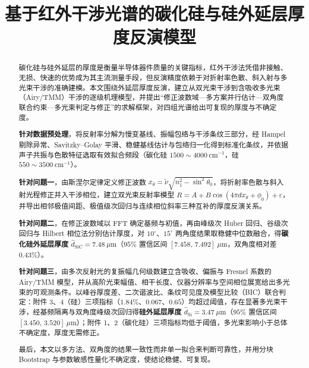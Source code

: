 \documentclass[withoutpreface,bwprint]{cumcmthesis}
\title{基于红外干涉光谱的碳化硅与硅外延层厚度反演模型}
\begin{document}
\maketitle

\begin{abstract}
碳化硅与硅外延层的厚度是衡量半导体器件质量的关键指标，红外干涉法凭借非接触、无损、快速的优势成为其主流测量手段，但反演精度依赖于对折射率色散、斜入射与多光束干涉的准确建模。本文围绕外延层厚度反演，建立从双光束干涉到含吸收多光束（Airy/TMM）干涉的逐级机理模型，并提出“修正波数域—多方案并行估计—双角度联合约束—多光束判定与修正”的求解框架，对四组光谱给出可复现的厚度与不确定度。

\textbf{针对数据预处理}，将反射率分解为慢变基线、振幅包络与干涉条纹三部分，经 Hampel 剔除异常、Savitzky--Golay 平滑、稳健基线估计与包络归一化得到标准化条纹，并依据声子共振与色散特征选取有效拟合频段（碳化硅 $1500\sim4000\ \mathrm{cm^{-1}}$，硅 $550\sim3500\ \mathrm{cm^{-1}}$）。

\textbf{针对问题一}，由斯涅尔定律定义修正波数 $x_\theta=\tilde\nu\sqrt{n_1^2-\sin^2\theta_0}$，将折射率色散与斜入射光程修正并入干涉相位，建立双光束反射率模型 $R=A+B\cos(4\pi d x_\theta+\phi_0)+\varepsilon$，并导出相邻极值间距、极值级次回归与连续相位斜率三种互补的厚度反演关系。

\textbf{针对问题二}，在修正波数域以 FFT 确定基频与初值，再由峰级次 Huber 回归、谷级次回归与 Hilbert 相位法分别估计厚度，对 $10^\circ$、$15^\circ$ 两角度结果取稳健中位数融合，得\textbf{碳化硅外延层厚度 $\widehat d_{\mathrm{SiC}}=7.48\ \mu\mathrm{m}$}（$95\%$ 置信区间 $[7.458,\,7.492]\ \mu\mathrm{m}$，双角度相对差 $0.43\%$）。

\textbf{针对问题三}，由多次反射光的复振幅几何级数建立含吸收、偏振与 Fresnel 系数的 Airy/TMM 模型，并从高阶光束幅值、相干长度、仪器分辨率与空间相位展宽给出多光束的可观测条件。以峰谷厚度差、二次谐波比、条纹可见度及模型比较（BIC）联合判定：附件 3、4（硅）三项指标（$1.84\%$、$0.067$、$0.65$）均超过阈值，存在显著多光束干涉，经基频隔离与双角度峰级次回归得\textbf{硅外延层厚度 $\widehat d_{\mathrm{Si}}=3.47\ \mu\mathrm{m}$}（$95\%$ 置信区间 $[3.450,\,3.520]\ \mu\mathrm{m}$）；附件 1、2（碳化硅）三项指标均低于阈值，多光束影响小于总体不确定度，厚度无需修正。

最后，本文以多方法、双角度的结果一致性而非单一拟合来判断可靠性，并用分块 Bootstrap 与参数敏感性量化不确定度，使结论稳健、可复现。




\end{abstract}
\end{document}
